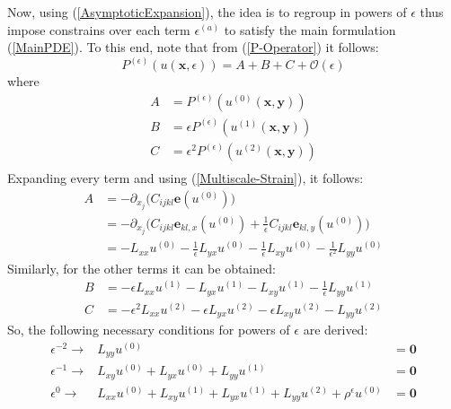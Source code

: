 Now, using (\ref{AsymptoticExpansion}), the idea is to regroup in powers of $\epsilon$ thus impose constrains over each term $\epsilon^{(a)}$ to satisfy the main formulation (\ref{MainPDE}). To this end, note that from (\ref{P-Operator}) it follows:
\begin{equation*}
    P^{(\epsilon)}(u(\mathbf{x},\epsilon)) = A + B + C + \mathcal{O}(\epsilon)
\end{equation*}
where 
\begin{equation*}
    \begin{array}{cc}
        A &= P^{(\epsilon)}(u^{(0)}(\mathbf{x},\mathbf{y})) \\
        B &= \epsilon P^{(\epsilon)}(u^{(1)}(\mathbf{x},\mathbf{y})) \\
        C &= \epsilon^2 P^{(\epsilon)}(u^{(2)}(\mathbf{x},\mathbf{y})) \\
    \end{array}
\end{equation*}
Expanding every term and using (\ref{Multiscale-Strain}), it follows:
\begin{align*}
    A &= - \partial_{x_j} \big( C_{ijkl}\mathbf{e}(u^{(0)}) \big) \\
    &=- \partial_{x_j} \big( C_{ijkl} \mathbf{e}_{kl,x} (u^{(0)}) + \frac{1}{\epsilon}C_{ijkl}\mathbf{e}_{kl,y}(u^{(0)}) \big)\\
    &= - L_{xx}u^{(0)} - \frac{1}{\epsilon} L_{yx}u^{(0)} - \frac{1}{\epsilon} L_{xy}u^{(0)} - \frac{1}{\epsilon^2}L_{yy}u^{(0)}
\end{align*}
Similarly, for the other terms it can be obtained:
\begin{align*}
    B &= -\epsilon L_{xx} u^{(1)} - L_{yx}u^{(1)} - L_{xy} u^{(1)} - \frac{1}{\epsilon} L_{yy}u^{(1)} \\
    C &= -\epsilon^2 L_{xx} u^{(2)} - \epsilon L_{yx}u^{(2)} - \epsilon L_{xy} u^{(2)} - L_{yy}u^{(2)} 
\end{align*}
So, the following necessary conditions for powers of $\epsilon$ are derived:
\begin{equation}
    \label{Epsilon-Separation}
    \begin{array}{ccc}
        \epsilon^{-2} \longrightarrow & L_{yy} u^{(0)} &= \mathbf{0} \\
        \epsilon^{-1} \longrightarrow & L_{xy}u^{(0)} + L_{yx} u^{(0)} + L_{yy} u^{(1)} &= \mathbf{0} \\
        \epsilon^{0} \longrightarrow & L_{xx} u^{(0)} + L_{xy} u^{(1)} + L_{yx} u^{(1)} + L_{yy} u^{(2)} + \rho^{\epsilon} u^{(0)} &= \mathbf{0}
    \end{array}
\end{equation}

